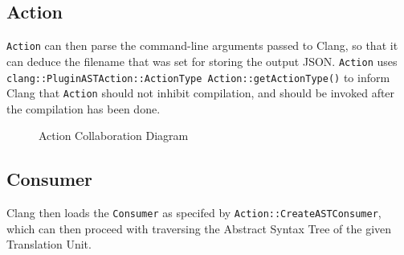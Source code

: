 \subsection{Action}
\lstinline|Action| can then parse the
command-line arguments passed to Clang, so that it can deduce the filename that
was set for storing the output JSON. \lstinline|Action| uses
\lstinline|clang::PluginASTAction::ActionType Action::getActionType()| to inform
Clang that \lstinline|Action| should not inhibit compilation, and should be
invoked after the compilation has been done.

\begin{figure}[h]
	\label{fig:action}
	\caption{Action Collaboration Diagram}
	\centering
\end{figure}

\subsection{Consumer}
Clang then loads the \lstinline|Consumer| as specifed by
\lstinline|Action::CreateASTConsumer|, which can then proceed with traversing
the Abstract Syntax Tree of the given Translation Unit.

